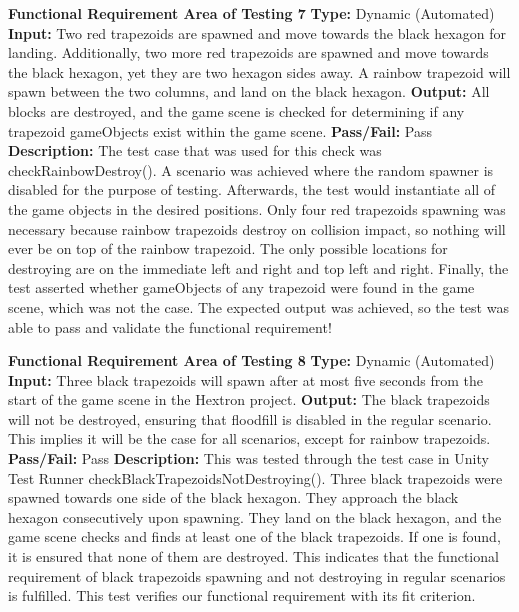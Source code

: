 \documentclass[12pt, titlepage]{article}
\begin{document}
    
    
    
    \noindent \textbf{Functional Requirement Area of Testing 7}
    \newline
    \textbf{Type:} Dynamic (Automated)
    \newline
    \textbf{Input:} Two red trapezoids are spawned and move towards the black hexagon for landing. Additionally, two more red trapezoids are spawned and move towards the black hexagon, yet they are two hexagon sides away. A rainbow trapezoid will spawn between the two columns, and land on the black hexagon.
    \newline
    \textbf{Output:} All blocks are destroyed, and the game scene is checked for determining if any trapezoid gameObjects exist within the game scene.\newline
    \textbf{Pass/Fail:} Pass
    \newline
    \textbf{Description:} The test case that was used for this check was checkRainbowDestroy(). A scenario was achieved where the random spawner is disabled for the purpose of testing. Afterwards, the test would instantiate all of the game objects in the desired positions. Only four red trapezoids spawning was necessary because rainbow trapezoids destroy on collision impact, so nothing will ever be on top of the rainbow trapezoid. The only possible locations for destroying are on the immediate left and right and top left and right. Finally, the test asserted whether gameObjects of any trapezoid were found in the game scene, which was not the case. The expected output was achieved, so the test was able to pass and validate the functional requirement! \newline \newline
    
    
    \noindent \textbf{Functional Requirement Area of Testing 8}
    \newline
    \textbf{Type:} Dynamic (Automated)
    \newline
    \textbf{Input:} Three black trapezoids will spawn after at most five seconds from the start of the game scene in the Hextron project.
    \newline
    \textbf{Output:} The black trapezoids will not be destroyed, ensuring that floodfill is disabled in the regular scenario. This implies it will be the case for all scenarios, except for rainbow trapezoids.
    \newline
    \textbf{Pass/Fail:} Pass
    \newline
    \textbf{Description:} This was tested through the test case in Unity Test Runner checkBlackTrapezoidsNotDestroying(). Three black trapezoids were spawned towards one side of the black hexagon. They approach the black hexagon consecutively upon spawning. They land on the black hexagon, and the game scene checks and finds at least one of the black trapezoids. If one is found, it is ensured that none of them are destroyed. This indicates that the functional requirement of black trapezoids spawning and not destroying in regular scenarios is fulfilled. This test verifies our functional requirement with its fit criterion.\newline
    
\end{document}
